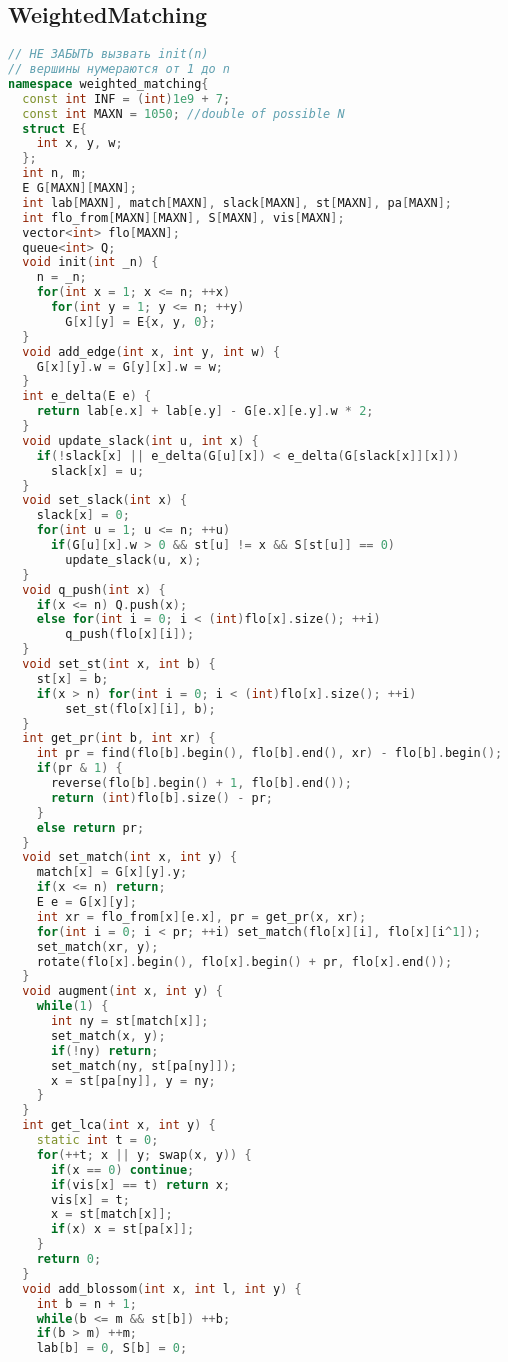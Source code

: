 \documentclass[9pt,a4paper,landscape,twosided]{extarticle}
\begin{document}
\begin{multicols*}{3}
\subsection{WeightedMatching}
\begin{lstlisting}[language=C++]
// НЕ ЗАБЫТЬ вызвать init(n)
// вершины нумераются от 1 до n
namespace weighted_matching{
  const int INF = (int)1e9 + 7;
  const int MAXN = 1050; //double of possible N
  struct E{
    int x, y, w;
  };
  int n, m;
  E G[MAXN][MAXN];
  int lab[MAXN], match[MAXN], slack[MAXN], st[MAXN], pa[MAXN];
  int flo_from[MAXN][MAXN], S[MAXN], vis[MAXN];
  vector<int> flo[MAXN];
  queue<int> Q;
  void init(int _n) {
    n = _n;
    for(int x = 1; x <= n; ++x)
      for(int y = 1; y <= n; ++y)
        G[x][y] = E{x, y, 0};
  }
  void add_edge(int x, int y, int w) {
    G[x][y].w = G[y][x].w = w;
  }
  int e_delta(E e) {
    return lab[e.x] + lab[e.y] - G[e.x][e.y].w * 2;
  }
  void update_slack(int u, int x) {
    if(!slack[x] || e_delta(G[u][x]) < e_delta(G[slack[x]][x]))
      slack[x] = u;
  }
  void set_slack(int x) {
    slack[x] = 0;
    for(int u = 1; u <= n; ++u)
      if(G[u][x].w > 0 && st[u] != x && S[st[u]] == 0)
        update_slack(u, x);
  }
  void q_push(int x) {
    if(x <= n) Q.push(x);
    else for(int i = 0; i < (int)flo[x].size(); ++i)
        q_push(flo[x][i]);
  }
  void set_st(int x, int b) {
    st[x] = b;
    if(x > n) for(int i = 0; i < (int)flo[x].size(); ++i)
        set_st(flo[x][i], b);
  }
  int get_pr(int b, int xr) {
    int pr = find(flo[b].begin(), flo[b].end(), xr) - flo[b].begin();
    if(pr & 1) {
      reverse(flo[b].begin() + 1, flo[b].end());
      return (int)flo[b].size() - pr;
    }
    else return pr;
  }
  void set_match(int x, int y) {
    match[x] = G[x][y].y;
    if(x <= n) return;
    E e = G[x][y];
    int xr = flo_from[x][e.x], pr = get_pr(x, xr);
    for(int i = 0; i < pr; ++i) set_match(flo[x][i], flo[x][i^1]);
    set_match(xr, y);
    rotate(flo[x].begin(), flo[x].begin() + pr, flo[x].end());
  }
  void augment(int x, int y) {
    while(1) {
      int ny = st[match[x]];
      set_match(x, y);
      if(!ny) return;
      set_match(ny, st[pa[ny]]);
      x = st[pa[ny]], y = ny;
    }
  }
  int get_lca(int x, int y) {
    static int t = 0;
    for(++t; x || y; swap(x, y)) {
      if(x == 0) continue;
      if(vis[x] == t) return x;
      vis[x] = t;
      x = st[match[x]];
      if(x) x = st[pa[x]];
    }
    return 0;
  }
  void add_blossom(int x, int l, int y) {
    int b = n + 1;
    while(b <= m && st[b]) ++b;
    if(b > m) ++m;
    lab[b] = 0, S[b] = 0;

\end{lstlisting}
\end{multicols*}
\end{document}
